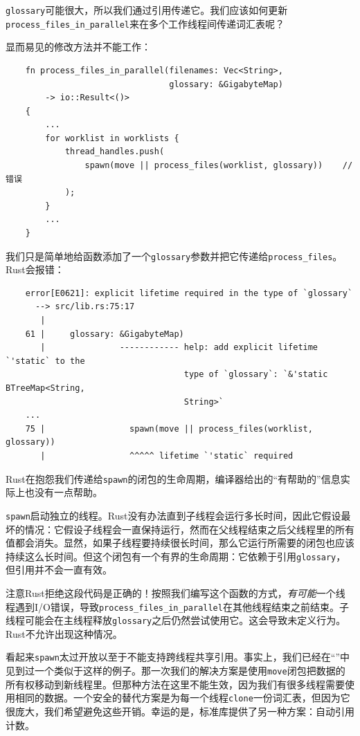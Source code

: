 \texttt{glossary}可能很大，所以我们通过引用传递它。我们应该如何更新\texttt{process\_files\_in\_parallel}来在多个工作线程间传递词汇表呢？

显而易见的修改方法并不能工作：
\begin{verbatim}
    fn process_files_in_parallel(filenames: Vec<String>,
                                 glossary: &GigabyteMap)
        -> io::Result<()>
    {
        ...
        for worklist in worklists {
            thread_handles.push(
                spawn(move || process_files(worklist, glossary))    // 错误
            );
        }
        ...
    }
\end{verbatim}

我们只是简单地给函数添加了一个\texttt{glossary}参数并把它传递给\texttt{process\_files}。Rust会报错：
\begin{verbatim}
    error[E0621]: explicit lifetime required in the type of `glossary`
      --> src/lib.rs:75:17
       |
    61 |     glossary: &GigabyteMap)
       |               ------------ help: add explicit lifetime `'static` to the 
                                    type of `glossary`: `&'static BTreeMap<String,
                                    String>`
    ...
    75 |                 spawn(move || process_files(worklist, glossary))
       |                 ^^^^^ lifetime `'static` required
\end{verbatim}

Rust在抱怨我们传递给\texttt{spawn}的闭包的生命周期，编译器给出的“有帮助的”信息实际上也没有一点帮助。

\texttt{spawn}启动独立的线程。Rust没有办法直到子线程会运行多长时间，因此它假设最坏的情况：它假设子线程会一直保持运行，然而在父线程结束之后父线程里的所有值都会消失。显然，如果子线程要持续很长时间，那么它运行所需要的闭包也应该持续这么长时间。但这个闭包有一个有界的生命周期：它依赖于引用\texttt{glossary}，但引用并不会一直有效。

注意Rust拒绝这段代码是正确的！按照我们编写这个函数的方式，\emph{有可能}一个线程遇到I/O错误，导致\texttt{process\_files\_in\_parallel}在其他线程结束之前结束。子线程可能会在主线程释放\texttt{glossary}之后仍然尝试使用它。这会导致未定义行为。Rust不允许出现这种情况。

看起来\texttt{spawn}太过开放以至于不能支持跨线程共享引用。事实上，我们已经在“”中见到过一个类似于这样的例子。那一次我们的解决方案是使用\texttt{move}闭包把数据的所有权移动到新线程里。但那种方法在这里不能生效，因为我们有很多线程需要使用相同的数据。一个安全的替代方案是为每一个线程\texttt{clone}一份词汇表，但因为它很庞大，我们希望避免这些开销。幸运的是，标准库提供了另一种方案：自动引用计数。

